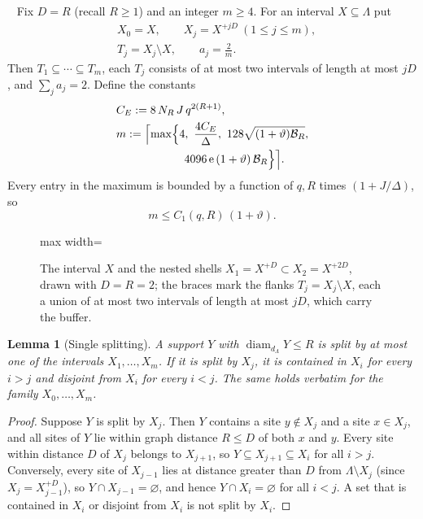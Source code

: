 \documentclass[aps,prx,reprint,superscriptaddress,floatfix,nofootinbib,longbibliography,amsmath,amssymb]{revtex4-2}
\newcommand{\diam}{\operatorname{diam}}
\newcommand{\cB}{\mathcal B}
\newcommand{\Lam}{\Lambda}
\newcommand{\e}{\mathrm e}
\theoremstyle{plain}
\newtheorem{lemma}[theorem]{Lemma}
\theoremstyle{definition}
\newcommand{\precisely}{\par\noindent{\bfseries Precisely.}\ }
\begin{document}
\precisely
Fix $D=R$ (recall $R\ge1$) and an integer $m\ge4$. For an interval $X\subseteq\Lam$
put
\[
\begin{split}
 &X_0=X,\qquad X_j=X^{+jD}\ (1\le j\le m),\\
 &T_j=X_j\setminus X,
 \qquad a_j=\frac2m .
\end{split}
\]
Then $T_1\subseteq\cdots\subseteq T_m$, each $T_j$ consists of at most two
intervals of length at most $jD$, and $\sum_ja_j=2$. Define the constants
\begin{equation}\label{eq:CE}
\begin{split}
 &C_E:=8\,N_R\,J\,q^{2(R+1)},\\
 &m:=\Bigl\lceil\max\Bigl\{4,\ \frac{4C_E}{\Delta},\ 128\sqrt{(1+\vartheta)\cB_R},\\
 &\qquad\qquad\qquad
 4096\,\e\,(1+\vartheta)\,\cB_R\Bigr\}\Bigr\rceil .
\end{split}
\end{equation}
Every entry in the maximum is bounded by a function of $q,R$ times
$(1+J/\Delta)$, so
\begin{equation}\label{eq:mbound}
 m\le C_1(q,R)\,(1+\vartheta).
\end{equation}

\begin{figure}[t]
\centering
\begin{adjustbox}{max width=\linewidth}

\end{adjustbox}
\caption{The interval $X$ and the nested shells $X_1=X^{+D}\subset X_2=X^{+2D}$, drawn with $D=R=2$; the braces mark the flanks $T_j=X_j\setminus X$, each a union of at most two intervals of length at most $jD$, which carry the buffer.}\label{fig:chain-shells}
\end{figure}

\begin{lemma}[Single splitting]\label{lem:singlesplit}
A support $Y$ with $\diam_{d_\Lam}Y\le R$ is split by at most one of the
intervals $X_1,\dots,X_m$. If it is split by $X_j$, it is contained in
$X_i$ for every $i>j$ and disjoint from $X_i$ for every $i<j$. The same
holds verbatim for the family $X_0,\dots,X_m$.
\end{lemma}
\begin{proof}
Suppose $Y$ is split by $X_j$. Then $Y$ contains a site $y\notin X_j$ and
a site $x\in X_j$, and all sites of $Y$ lie within graph distance $R\le D$
of both $x$ and $y$. Every site within distance $D$ of $X_j$ belongs to
$X_{j+1}$, so $Y\subseteq X_{j+1}\subseteq X_i$ for all $i>j$. Conversely,
every site of $X_{j-1}$ lies at distance greater than $D$ from $\Lam\setminus X_j$
(since $X_j=X_{j-1}^{+D}$), so $Y\cap X_{j-1}=\varnothing$, and hence
$Y\cap X_i=\varnothing$ for all $i<j$. A set that is contained in $X_i$ or
disjoint from $X_i$ is not split by $X_i$.
\end{proof}
\end{document}
